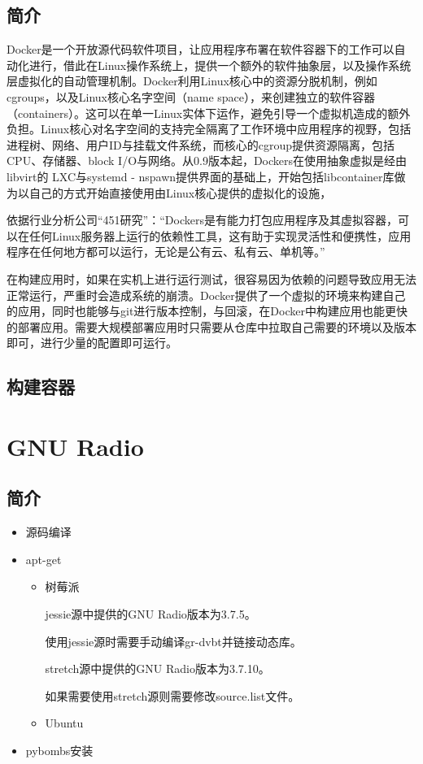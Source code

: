 	\subsection{简介}
	\par Docker是一个开放源代码软件项目，让应用程序布署在软件容器下的工作可以自动化进行，借此在Linux操作系统上，提供一个额外的软件抽象层，以及操作系统层虚拟化的自动管理机制。Docker利用Linux核心中的资源分脱机制，例如cgroups，以及Linux核心名字空间（name space），来创建独立的软件容器（containers）。这可以在单一Linux实体下运作，避免引导一个虚拟机造成的额外负担。Linux核心对名字空间的支持完全隔离了工作环境中应用程序的视野，包括进程树、网络、用户ID与挂载文件系统，而核心的cgroup提供资源隔离，包括CPU、存储器、block I/O与网络。从0.9版本起，Dockers在使用抽象虚拟是经由libvirt的 LXC与systemd - nspawn提供界面的基础上，开始包括libcontainer库做为以自己的方式开始直接使用由Linux核心提供的虚拟化的设施，
	\par 依据行业分析公司“451研究”：“Dockers是有能力打包应用程序及其虚拟容器，可以在任何Linux服务器上运行的依赖性工具，这有助于实现灵活性和便携性，应用程序在任何地方都可以运行，无论是公有云、私有云、单机等。”\cite{ wiki:Docker} 
	\par 在构建应用时，如果在实机上进行运行测试，很容易因为依赖的问题导致应用无法正常运行，严重时会造成系统的崩溃。Docker提供了一个虚拟的环境来构建自己的应用，同时也能够与git进行版本控制，与回滚，在Docker中构建应用也能更快的部署应用。需要大规模部署应用时只需要从仓库中拉取自己需要的环境以及版本即可，进行少量的配置即可运行。
	\subsection{构建容器}
\section{GNU Radio}
	\subsection{简介}
	\begin{itemize}
		\item 源码编译
		\item apt-get
			\begin{itemize}
				\item 树莓派
				\par jessie源中提供的GNU Radio版本为3.7.5。
				\par 使用jessie源时需要手动编译gr-dvbt并链接动态库。
				\par stretch源中提供的GNU Radio版本为3.7.10。
				\par 如果需要使用stretch源则需要修改source.list文件。
				\item Ubuntu
			\end{itemize}
		\item pybombs安装
	\end{itemize}
